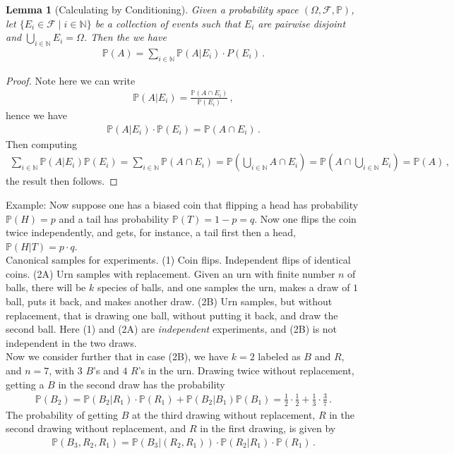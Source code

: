 \documentclass[11pt, onesided]{book}
\theoremstyle{break}
\theoremstyle{break}
\newtheorem{lem}{Lemma}[thm]
\newcommand{\N}{\mathbb{N}}
\newcommand{\example}{\color{green}Example: \color{black}}
\begin{document}
\begin{lem}[Calculating by Conditioning] 
Given a probability space $(\Omega, \mathcal{F}, \mathbb{P})$, let $\{E_i\in \mathcal{F}\mid i \in \N\}$ be a collection of events such that $E_i$ are pairwise disjoint and $\bigcup_{i \in \N} E_i = \Omega$. Then the we have 
\begin{align*}
\mathbb{P}(A) = \sum_{i\in \N} \mathbb{P}(A|E_i)\cdot P(E_i)\,.
\end{align*}
\end{lem}
\begin{proof}
Note here we can write
\begin{align*}
\mathbb{P}(A|E_i) = \frac{\mathbb{P}(A\cap E_i)}{\mathbb{P}(E_i)}\,,
\end{align*}
hence we have 
\begin{align*}
\mathbb{P}(A|E_i) \cdot \mathbb{P}(E_i) = \mathbb{P}(A\cap E_i)\,.
\end{align*}
Then computing
\begin{align*}
\sum_{i \in \N} \mathbb{P}(A|E_i) \mathbb{P}(E_i) = \sum_{i \in \N} \mathbb{P}(A\cap E_i) = \mathbb{P}\left( \bigcup_{i\in \N}A\cap E_i\right) = \mathbb{P}\left( A\cap \bigcup_{i \in \N} E_i \right) = \mathbb{P}(A)\,,
\end{align*}
the result then follows. 
\end{proof}

\example Now suppose one has a biased coin that flipping a head has probability $\mathbb{P}(H) = p$ and a tail has probability $\mathbb{P}(T) = 1-p = q$. Now one flips the coin twice independently, and gets, for instance, a tail first then a head, $\mathbb{P}(H|T) = p\cdot q$.\\

 Canonical samples for experiments. (1) Coin flips. Independent flips of identical coins. (2A) Urn samples with replacement. Given an urn with finite number $n$ of balls, there will be $k$ species of balls, and one samples the urn, makes a draw of $1$ ball, puts it back, and makes another draw. (2B) Urn samples, but without replacement, that is drawing one ball, without putting it back, and draw the second ball. Here (1) and (2A) are \textit{independent} experiments, and (2B) is not independent in the two draws. \\
 
 Now we consider further that in case (2B), we have $k = 2$ labeled as $B$ and $R$, and $n = 7$, with $3$ $B$'s and $4$ $R$'s in the urn. Drawing twice without replacement, getting a $B$ in the second draw has the probability
 \begin{align*}
 \mathbb{P}(B_2) = \mathbb{P}(B_2 | R_1) \cdot \mathbb{P}(R_1) + \mathbb{P}(B_2 | B_1) \mathbb{P}(B_1) = \frac{1}{2}\cdot \frac{1}{2}+ \frac{1}{3}\cdot \frac{3}{7}\,.
 \end{align*}
The probability of getting $B$ at the third drawing without replacement, $R$ in the second drawing without replacement, and $R$ in the first drawing, is given by
\begin{align*}
\mathbb{P}(B_3,R_2,R_1) = \mathbb{P}(B_3 | (R_2,R_1))\cdot \mathbb{P}(R_2|R_1) \cdot \mathbb{P}(R_1)\,.
\end{align*}
\end{document}
